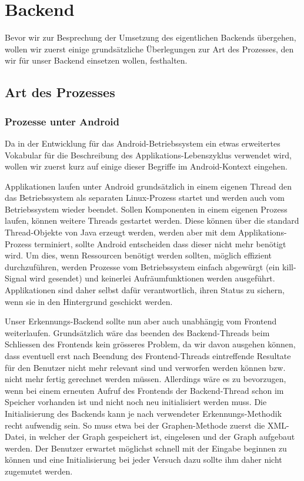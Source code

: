 \chapter{Backend}

Bevor wir zur Besprechung der Umsetzung des eigentlichen Backends übergehen, wollen wir zuerst einige grundsätzliche Überlegungen zur Art des Prozesses, den wir für unser Backend einsetzen wollen, festhalten.

\section{Art des Prozesses}\label{lbl_prozess_art}

\subsection{Prozesse unter Android}

Da in der Entwicklung für das Android-Betriebssystem ein etwas erweitertes Vokabular für die Beschreibung des Applikations-Lebenszyklus verwendet wird, wollen wir zuerst kurz auf einige dieser Begriffe im Android-Kontext eingehen.

Applikationen laufen unter Android grundsätzlich in einem eigenen Thread den das Betriebssystem als separaten Linux-Prozess startet und werden auch vom Betriebssystem wieder beendet. Sollen Komponenten in einem eigenen Prozess laufen, können weitere Threads gestartet werden\cite{adglc}. Diese können über die standard Thread-Objekte von Java erzeugt werden, werden aber mit dem Applikations-Prozess terminiert, sollte Android entscheiden dass dieser nicht mehr benötigt wird. Um dies, wenn Ressourcen benötigt werden sollten, möglich effizient durchzuführen, werden Prozesse vom Betriebssystem einfach abgewürgt (ein kill-Signal wird gesendet) und keinerlei Aufräumfunktionen werden ausgeführt. Applikationen sind daher selbst dafür verantwortlich, ihren Status zu sichern, wenn sie in den Hintergrund geschickt werden\cite{adbmt}.

Unser Erkennungs-Backend sollte nun aber auch unabhängig vom Frontend weiterlaufen. Grundsätzlich wäre das beenden des Backend-Threads beim Schliessen des Frontends kein grösseres Problem, da wir davon ausgehen können, dass eventuell erst nach Beendung des Frontend-Threads eintreffende Resultate für den Benutzer nicht mehr relevant sind und verworfen werden können bzw. nicht mehr fertig gerechnet werden müssen. Allerdings wäre es zu bevorzugen, wenn bei einem erneuten Aufruf des Frontends der Backend-Thread schon im Speicher vorhanden ist und nicht noch neu initialisiert werden muss. Die Initialisierung des Backends kann je nach verwendeter Erkennungs-Methodik recht aufwendig sein. So muss etwa bei der Graphen-Methode zuerst die XML-Datei, in welcher der Graph gespeichert ist, eingelesen und der Graph aufgebaut werden. Der Benutzer erwartet möglichst schnell mit der Eingabe beginnen zu können und eine Initialisierung bei jeder Versuch dazu sollte ihm daher nicht zugemutet werden.

